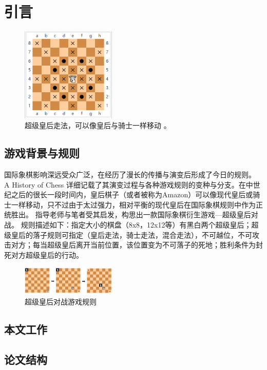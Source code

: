 \chapter{引言}
\label{chap:introduction}

\begin{figure}[htb]
    \centering
    \includegraphics[width=0.4\textwidth]{amazon.PNG}
    \caption[超级皇后]{%
      超级皇后走法，可以像皇后与骑士一样移动%
      \cite{wikiAmazon}。}
    \label{fig:superQueen}
  \end{figure}

\section{游戏背景与规则}
国际象棋影响深远受众广泛，在经历了漫长的传播与演变后形成了今日的规则。
A History of Chess 详细记载了其演变过程与各种游戏规则的变种与分支\cite{murray2015history}。在中世纪之后的很长一段时间内，皇后棋子（或者被称为Amazon）可以像现代皇后或骑士一样移动，只不过由于太过强力，相对平衡的现代皇后在国际象棋规则中作为正统胜出。
指导老师与笔者受其启发，构思出一款国际象棋衍生游戏—超级皇后对战。
规则描述如下：指定大小的棋盘（8x8，12x12等）有黑白两个超级皇后；超级皇后的落子规则可指定（皇后走法，骑士走法，混合走法），不可越位，不可攻击对方；每当超级皇后离开当前位置，该位置变为不可落子的死地；胜利条件为封死对方超级皇后的行动。

\begin{figure}[htb]
    \centering
    \includegraphics[width=0.4\textwidth]{rules.PNG}
    \caption[游戏规则]{%
      超级皇后对战游戏规则%
      }
    \label{fig:superQueenRules}
  \end{figure}


\section{本文工作}

\section{论文结构}

